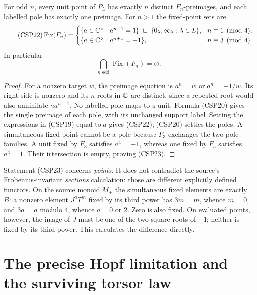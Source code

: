 \begin{proposition}\label{prop:fibresfixed}
For odd $n$, every unit point of $P_L$ has exactly $n$ distinct
$F_n$-preimages, and each labelled pole has exactly one preimage.
For $n>1$ the fixed-point sets are
\begin{equation}\tag{CSP22}
 \operatorname{Fix}(F_n)=
 \begin{cases}
 \{a\in\mathbb C^\times:a^{n-1}=1\}\ \sqcup\
       \{0_\lambda,\infty_\lambda:\lambda\in L\},&n\equiv1\pmod4,\\
 \{a\in\mathbb C^\times:a^{n+1}=-1\},&n\equiv3\pmod4.
 \end{cases}
\end{equation}
In particular
\begin{equation}\tag{CSP23}
 \bigcap_{n\text{ odd}}\operatorname{Fix}(F_n)=\varnothing.
\end{equation}
\end{proposition}
\begin{proof}
For a nonzero target $w$, the preimage equation is $a^n=w$ or
$a^n=-1/w$.  Its right side is nonzero and its $n$ roots in $\mathbb C$
are distinct, since a repeated root would also annihilate $na^{n-1}$.
No labelled pole maps to a unit.  Formula (CSP20) gives the single
preimage of each pole, with its unchanged support label.  Setting
the expressions in (CSP19) equal to $a$ gives (CSP22); (CSP20)
settles the poles.  A simultaneous fixed point cannot be a pole
because $F_3$ exchanges the two pole families.  A unit fixed by $F_3$
satisfies $a^4=-1$, whereas one fixed by $F_5$ satisfies $a^4=1$.
Their intersection is empty, proving (CSP23).
\end{proof}

Statement (CSP23) concerns \emph{points}.  It does not contradict
the source's Frobenius-invariant \emph{sections} calculation: those
are different explicitly defined functors.  On the source monoid
$M_+$ the simultaneous fixed elements are exactly $B$: a nonzero
element $J^aT^m$ fixed by its third power has $3m=m$, whence $m=0$,
and $3a=a$ modulo $4$, whence $a=0$ or $2$.  Zero is also fixed.
On evaluated points, however, the image of $J$ must be one of the two
square roots of $-1$; neither is fixed by its third power.  This
calculates the difference directly.

\section{The precise Hopf limitation and the surviving torsor law}

